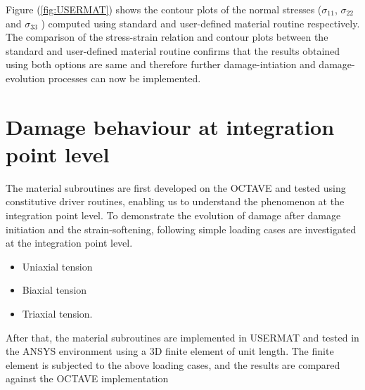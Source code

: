 \documentclass[12pt]{report}
\begin{document}
Figure (\ref{fig:USERMAT}) shows the contour plots of the normal stresses ($\sigma_{11}$, $\sigma_{22}$ and $\sigma_{33}$ ) computed using standard and user-defined material routine respectively. The comparison of the stress-strain relation and contour plots between the standard and user-defined material routine confirms that the results obtained using both options are same and therefore further damage-intiation and damage-evolution processes can now be implemented.
\section{Damage behaviour at integration point level}
\indent\indent\indent The material subroutines are first developed on the OCTAVE and tested using constitutive driver routines, enabling us to understand the phenomenon at the integration point level. To demonstrate the evolution of damage after damage initiation and the strain-softening, following simple loading cases are investigated at the integration point level.
\begin{itemize}
\item Uniaxial tension
\item Biaxial tension
\item Triaxial tension.
\end{itemize} 
After that, the material subroutines are implemented in USERMAT and tested in the ANSYS environment using a 3D finite element of unit length. The finite element is subjected to the above loading cases, and the results are compared against the OCTAVE implementation
\FloatBarrier
\end{document}
